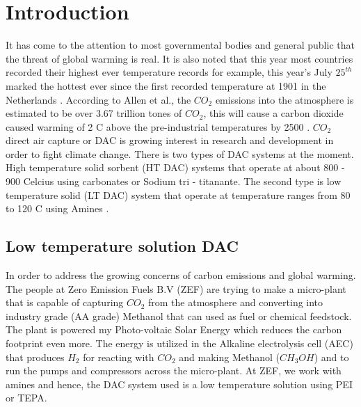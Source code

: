 \section{Introduction}
It has come to the attention to most governmental bodies and general public that the threat of global warming is real. It is also noted that this year most countries recorded their highest ever temperature records for example, this year's July $25^{th}$ marked the hottest ever since the first recorded temperature at 1901 in the Netherlands \cite{Pieters2019}. According to Allen et al., the $CO_2$ emissions into the atmosphere is estimated to be over 3.67 trillion tones of $CO_2$, this will cause a carbon dioxide caused warming of 2 \degree C above the pre-industrial temperatures by 2500 \cite{Allen2009}. $CO_2$ direct air capture or DAC is growing interest in research and development in order to fight climate change. There is two types of DAC systems at the moment. High temperature solid sorbent (HT DAC) systems that operate at about 800 - 900 \degree Celcius using carbonates or Sodium tri - titanante. The second type is low temperature solid (LT DAC) system that operate at temperature ranges from 80 to 120 \degree C using Amines \cite{Fasihi2019}.

\subsection{Low temperature solution DAC}
\noindent
In order to address the growing concerns of carbon emissions and global warming. The people at Zero Emission Fuels B.V (ZEF) are trying to make a micro-plant that is capable of capturing $CO_2$ from the atmosphere and converting into industry grade (AA grade) Methanol that can used as fuel or chemical feedstock. The plant is powered my Photo-voltaic Solar Energy which reduces the carbon footprint even more. The energy is utilized in the Alkaline electrolysis cell (AEC) that produces $H_2$ for reacting with $CO_2$ and making Methanol ($CH_{3}OH$) and to run the pumps and compressors across the micro-plant. At ZEF, we work with amines and hence, the DAC system used is a low temperature solution using PEI or TEPA. 

